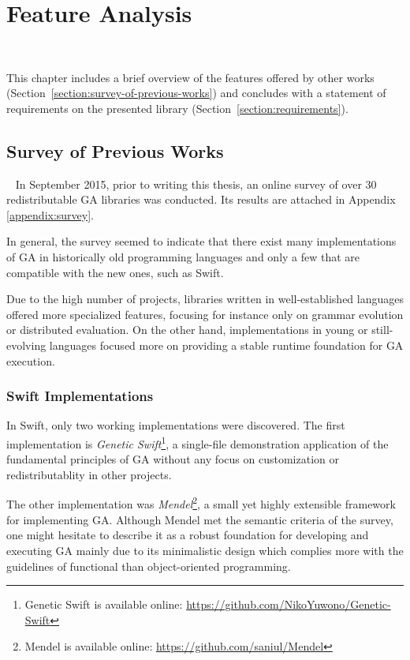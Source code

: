 \chapter{Feature Analysis}~\label{chapter:feature-analysis}

This chapter includes a brief overview of the features offered by other works (Section~\ref{section:survey-of-previous-works}) and concludes with a statement of requirements on the presented library (Section~\ref{section:requirements}).

\section{Survey of Previous Works}~\label{section:survey-of-previous-works}
In September 2015, prior to writing this thesis, an online survey of over 30 redistributable GA libraries was conducted. Its results are attached in Appendix \ref{appendix:survey}.

In general, the survey seemed to indicate that there exist many implementations of GA in historically old programming languages and only a few that are compatible with the new ones, such as Swift.

Due to the high number of projects, libraries written in well-established languages offered more specialized features, focusing for instance only on grammar evolution or distributed evaluation. On the other hand, implementations in young or still-evolving languages focused more on providing a stable runtime foundation for GA execution.

\subsection{Swift Implementations}
In Swift, only two working implementations were discovered. The first implementation is \textit{Genetic Swift}\footnote{Genetic Swift is available online: \url{https://github.com/NikoYuwono/Genetic-Swift}}, a single-file demonstration application of the fundamental principles of GA without any focus on customization or redistributablity in other projects.

The other implementation was \textit{Mendel}\footnote{Mendel is available online: \url{https://github.com/saniul/Mendel}}, a small yet highly extensible framework for implementing GA. Although Mendel met the semantic criteria of the survey, one might hesitate to describe it as a robust foundation for developing and executing GA mainly due to its minimalistic design which complies more with the guidelines of functional than object-oriented programming.

